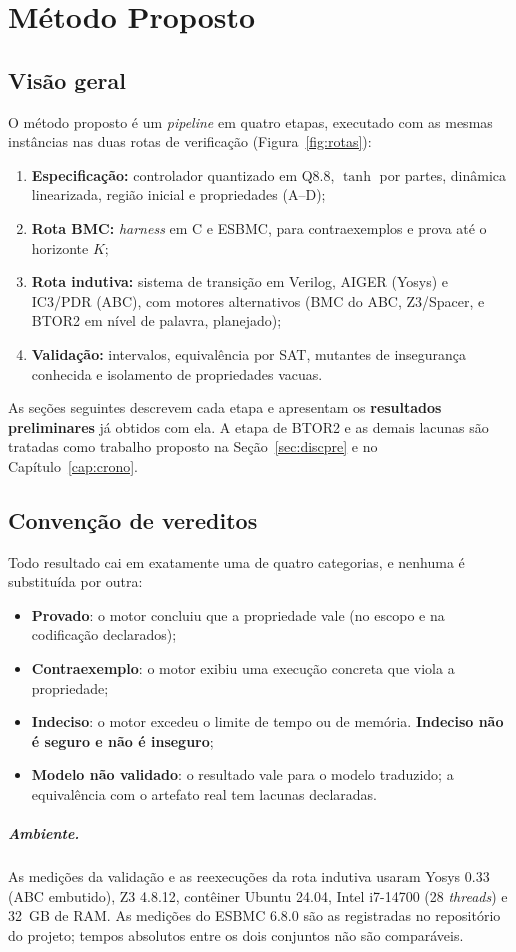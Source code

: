 \chapter{Método Proposto}\label{cap:metod}

\section{Visão geral}

O método proposto é um \emph{pipeline} em quatro etapas, executado com as mesmas instâncias nas duas rotas de verificação (Figura~\ref{fig:rotas}):
\begin{enumerate}
  \item \textbf{Especificação:} controlador quantizado em Q8.8, $\tanh$ por partes, dinâmica linearizada, região inicial e propriedades (A--D);
  \item \textbf{Rota BMC:} \emph{harness} em C e ESBMC, para contraexemplos e prova até o horizonte $K$;
  \item \textbf{Rota indutiva:} sistema de transição em Verilog, AIGER (Yosys) e IC3/PDR (ABC), com motores alternativos (BMC do ABC, Z3/Spacer, e BTOR2 em nível de palavra, planejado);
  \item \textbf{Validação:} intervalos, equivalência por SAT, mutantes de insegurança conhecida e isolamento de propriedades vacuas.
\end{enumerate}
As seções seguintes descrevem cada etapa e apresentam os \textbf{resultados preliminares} já obtidos com ela. A etapa de BTOR2 e as demais lacunas são tratadas como trabalho proposto na Seção~\ref{sec:discpre} e no Capítulo~\ref{cap:crono}.

\section{Convenção de vereditos}

Todo resultado cai em exatamente uma de quatro categorias, e nenhuma é substituída por outra:
\begin{itemize}
  \item \textbf{Provado}: o motor concluiu que a propriedade vale (no escopo e na codificação declarados);
  \item \textbf{Contraexemplo}: o motor exibiu uma execução concreta que viola a propriedade;
  \item \textbf{Indeciso}: o motor excedeu o limite de tempo ou de memória. \textbf{Indeciso não é seguro e não é inseguro};
  \item \textbf{Modelo não validado}: o resultado vale para o modelo traduzido; a equivalência com o artefato real tem lacunas declaradas.
\end{itemize}

\paragraph{Ambiente.} As medições da validação e as reexecuções da rota indutiva usaram Yosys 0.33 (ABC embutido), Z3 4.8.12, contêiner Ubuntu 24.04, Intel i7-14700 (28 \emph{threads}) e 32~GB de RAM. As medições do ESBMC 6.8.0 são as registradas no repositório do projeto; tempos absolutos entre os dois conjuntos não são comparáveis.
